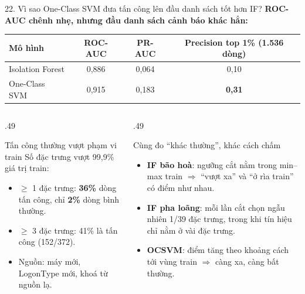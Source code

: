 \documentclass[aspectratio=169, 10pt]{beamer}
\begin{document}
\begin{frame}{22. Vì sao One-Class SVM đưa tấn công lên đầu danh sách tốt hơn IF?}{}
\small
\textbf{ROC-AUC chênh nhẹ, nhưng đầu danh sách cảnh báo khác hẳn:}
\par\vspace{.3em}
\begin{center}\footnotesize
\begin{tabular}{@{}lccc@{}}
\toprule\rowcolor{socblue!10}\textbf{Mô hình} & \textbf{ROC-AUC} & \textbf{PR-AUC} & \textbf{Precision top 1\% (1.536 dòng)}\\\midrule
Isolation Forest & 0,886 & 0,064 & 0,10\\
\rowcolor{socteal!10}One-Class SVM & 0,915 & 0,183 & \textbf{0,31}\\\bottomrule
\end{tabular}
\end{center}
\vspace{.2em}
\begin{columns}[T,onlytextwidth]
\begin{column}{.49\textwidth}
\begin{soccard}{Tấn công thường vượt phạm vi train}
Số đặc trưng vượt 99,9\% giá trị train:
\begin{itemize}\setlength\itemsep{1pt}
\item $\geq$ 1 đặc trưng: \textbf{36\%} dòng tấn công, chỉ \textbf{2\%} dòng bình thường.
\item $\geq$ 3 đặc trưng: 41\% là tấn công (152/372).
\item Nguồn: máy mới, LogonType mới, khoá từ nguồn lạ.
\end{itemize}
\end{soccard}
\end{column}
\begin{column}{.49\textwidth}
\begin{soccard}{Cùng đo ``khác thường'', khác cách chấm}
\begin{itemize}\setlength\itemsep{1pt}
\item \textbf{IF bão hoà}: ngưỡng cắt nằm trong min--max train $\Rightarrow$ ``vượt xa'' và ``ở rìa train'' có điểm như nhau.
\item \textbf{IF pha loãng}: mỗi lần cắt chọn ngẫu nhiên 1/39 đặc trưng, trong khi tín hiệu chỉ nằm ở vài đặc trưng.
\item \textbf{OCSVM}: điểm tăng theo khoảng cách tới vùng train $\Rightarrow$ càng xa, càng bất thường.
\end{itemize}
\end{soccard}
\end{column}
\end{columns}
\end{frame}
\end{document}
